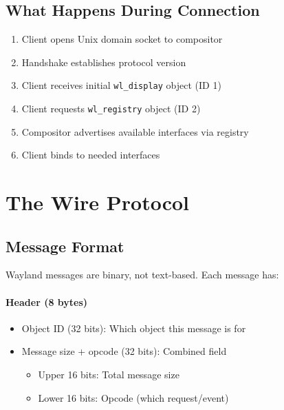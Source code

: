 \subsection{What Happens During Connection}

\begin{enumerate}
    \item Client opens Unix domain socket to compositor
    \item Handshake establishes protocol version
    \item Client receives initial \texttt{wl\_display} object (ID 1)
    \item Client requests \texttt{wl\_registry} object (ID 2)
    \item Compositor advertises available interfaces via registry
    \item Client binds to needed interfaces
\end{enumerate}

\section{The Wire Protocol}

\subsection{Message Format}

Wayland messages are binary, not text-based. Each message has:

\paragraph{Header (8 bytes)}
\begin{itemize}
    \item Object ID (32 bits): Which object this message is for
    \item Message size + opcode (32 bits): Combined field
        \begin{itemize}
            \item Upper 16 bits: Total message size
            \item Lower 16 bits: Opcode (which request/event)
        \end{itemize}
\end{itemize}

